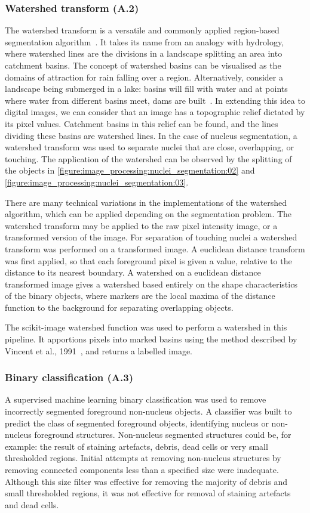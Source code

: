 \subsubsection{Watershed transform (A.2)}
The watershed transform is a versatile and commonly applied region-based segmentation algorithm~\cite{Vincent1991}. It takes its name from an analogy with hydrology, where watershed lines are the divisions in a landscape splitting an area into catchment basins. The concept of watershed basins can be visualised as the domains of attraction for rain falling over a region. Alternatively, consider a landscape being submerged in a lake: basins will fill with water and at points where water from different basins meet, dams are built~\cite{Roerdink2000}. In extending this idea to digital images, we can consider that an image has a topographic relief dictated by its pixel values. Catchment basins in this relief can be found, and the lines dividing these basins are watershed lines. In the case of nucleus segmentation, a watershed transform was used to separate nuclei that are close, overlapping, or touching. The application of the watershed can be observed by the splitting of the objects in \autoref{figure:image_processing:nuclei_segmentation:02} and \autoref{figure:image_processing:nuclei_segmentation:03}.

There are many technical variations in the implementations of the watershed algorithm, which can be applied depending on the segmentation problem. The watershed transform may be applied to the raw pixel intensity image, or a transformed version of the image. For separation of touching nuclei a watershed transform was performed on a transformed image. A euclidean distance transform was first applied, so that each foreground pixel is given a value, relative to the distance to its nearest boundary. A watershed on a euclidean distance transformed image gives a watershed based entirely on the shape characteristics of the binary objects, where markers are the local maxima of the distance function to the background for separating overlapping objects.

The scikit-image watershed function was used to perform a watershed in this pipeline. It apportions pixels into marked basins using the method described by Vincent et al., 1991~\cite{Vincent1991}, and returns a labelled image.

\subsubsection{Binary classification (A.3)}
A supervised machine learning binary classification was used to remove incorrectly segmented foreground non-nucleus objects. A classifier was built to predict the class of segmented foreground objects, identifying nucleus or non-nucleus foreground structures. Non-nucleus segmented structures could be, for example: the result of staining artefacts, debris, dead cells or very small thresholded regions. Initial attempts at removing non-nucleus structures by removing connected components less than a specified size were inadequate. Although this size filter was effective for removing the majority of debris and small thresholded regions, it was not effective for removal of staining artefacts and dead cells.

